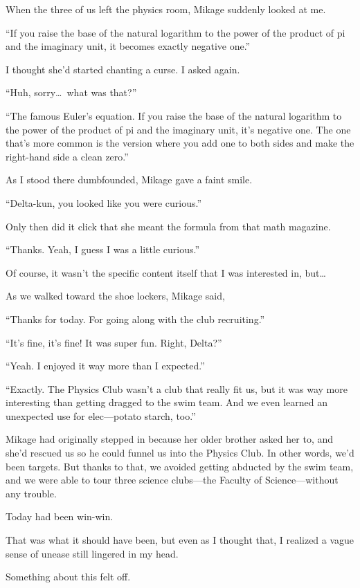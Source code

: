 \documentclass[
    a4paper,
    12pt,
    twoside,
    openany,
    UTF8,
    fontset=windows
]{ctexbook}
\begin{document}
When the three of us left the physics room, Mikage suddenly looked at me.

``If you raise the base of the natural logarithm to the power of the product of pi and the imaginary unit, it becomes exactly negative one.''

I thought she'd started chanting a curse. I asked again.

``Huh, sorry\dots\ what was that?''

``The famous Euler's equation. If you raise the base of the natural logarithm to the power of the product of pi and the imaginary unit, it's negative one. The one that's more common is the version where you add one to both sides and make the right-hand side a clean zero.''

As I stood there dumbfounded, Mikage gave a faint smile.

``Delta-kun, you looked like you were curious.''

Only then did it click that she meant the formula from that math magazine.

``Thanks. Yeah, I guess I was a little curious.''

Of course, it wasn't the specific content itself that I was interested in, but\dots

As we walked toward the shoe lockers, Mikage said,

``Thanks for today. For going along with the club recruiting.''

``It's fine, it's fine! It was super fun. Right, Delta?''

``Yeah. I enjoyed it way more than I expected.''

``Exactly. The Physics Club wasn't a club that really fit us, but it was way more interesting than getting dragged to the swim team. And we even learned an unexpected use for elec---potato starch, too.''

Mikage had originally stepped in because her older brother asked her to, and she'd rescued us so he could funnel us into the Physics Club. In other words, we'd been targets. But thanks to that, we avoided getting abducted by the swim team, and we were able to tour three science clubs---the Faculty of Science---without any trouble.

Today had been win-win.

That was what it should have been, but even as I thought that, I realized a vague sense of unease still lingered in my head.

Something about this felt off.
\end{document}
